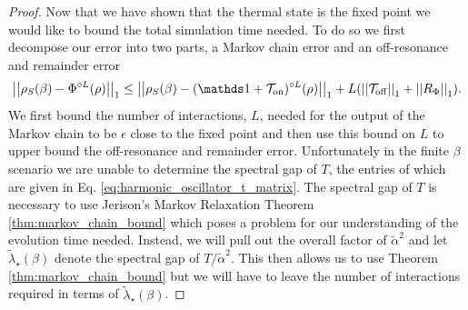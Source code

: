 \begin{proof}
    Now that we have shown that the thermal state is the fixed point we would like to bound the total simulation time needed. To do so we first decompose our error into two parts, a Markov chain error and an off-resonance and remainder error
    \begin{equation}
        \norm{\rho_S(\beta) - \Phi^{\circ L}(\rho)}_1 \le \norm{\rho_S(\beta) - (\identity + \TT_{\on})^{\circ L}(\rho)}_1 + L(\norm{\TT_{\off}}_1 + \norm{R_{\Phi}}_1 ). \label{eq:harmonic_oscillator_error_breakdown}
    \end{equation}
    We first bound the number of interactions, $L$, needed for the output of the Markov chain to be $\epsilon$ close to the fixed point and then use this bound on $L$ to upper bound the off-resonance and remainder error. Unfortunately in the finite $\beta$ scenario we are unable to determine the spectral gap of $T$, the entries of which are given in Eq. \eqref{eq:harmonic_oscillator_t_matrix}.  The spectral gap of $T$ is necessary to use Jerison's Markov Relaxation Theorem \ref{thm:markov_chain_bound} which poses a problem for our understanding of the evolution time needed. Instead, we will pull out the overall factor of $\widetilde{\alpha}^2$ and let $\widetilde{\lambda}_\star(\beta)$ denote the spectral gap of $T/\widetilde{\alpha}^2$. This then allows us to use Theorem \ref{thm:markov_chain_bound} but we will have to leave the number of interactions required in terms of $\widetilde{\lambda}_\star(\beta)$.


\end{proof}
